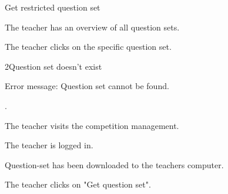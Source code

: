 \begin{uc}{Get restricted question set}
    \begin{uc-mss}
    \item The teacher has an overview of all question sets.
    \item The teacher clicks on the specific question set.
    \end{uc-mss}

    \begin{uc-ext}
        \begin{uc-fail}{2}{Question set doesn't exist}
        \item Error message: Question set cannot be found.
        \item {}.
        \end{uc-fail}
    \end{uc-ext}

    \begin{uc-pre}
	\item The teacher visits the competition management.
    	\item The teacher is logged in.
    \end{uc-pre}

    \begin{uc-post}
    \item Question-set has been downloaded to the teachers computer.
    \end{uc-post}

    \begin{uc-trig}
        The teacher clicks on "Get question set".
    \end{uc-trig}

\end{uc}
